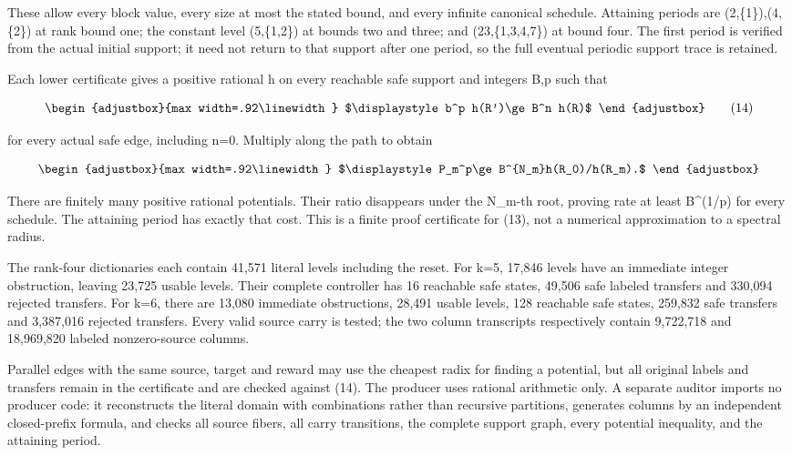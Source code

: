 These allow every block value, every size at most the stated bound, and every infinite canonical schedule. Attaining periods are (2,\{1\}),(4,\{2\}) at rank bound one; the constant level (5,\{1,2\}) at bounds two and three; and (23,\{1,3,4,7\}) at bound four. The first period is verified from the actual initial support; it need not return to that support after one period, so the full eventual periodic support trace is retained.

Each lower certificate gives a positive rational h on every reachable safe support and integers B,p such that

\[
\begin{adjustbox}{max width=.92\linewidth}
$\displaystyle b^p h(R')\ge B^n h(R)$
\end{adjustbox}
\tag{14}
\]

for every actual safe edge, including n=0. Multiply along the path to obtain

\[
\begin{adjustbox}{max width=.92\linewidth}
$\displaystyle P_m^p\ge B^{N_m}h(R_0)/h(R_m).$
\end{adjustbox}
\]

There are finitely many positive rational potentials. Their ratio disappears under the N\_m-th root, proving rate at least B\^{}(1/p) for every schedule. The attaining period has exactly that cost. This is a finite proof certificate for (13), not a numerical approximation to a spectral radius.

The rank-four dictionaries each contain 41,571 literal levels including the reset. For k=5, 17,846 levels have an immediate integer obstruction, leaving 23,725 usable levels. Their complete controller has 16 reachable safe states, 49,506 safe labeled transfers and 330,094 rejected transfers. For k=6, there are 13,080 immediate obstructions, 28,491 usable levels, 128 reachable safe states, 259,832 safe transfers and 3,387,016 rejected transfers. Every valid source carry is tested; the two column transcripts respectively contain 9,722,718 and 18,969,820 labeled nonzero-source columns.

Parallel edges with the same source, target and reward may use the cheapest radix for finding a potential, but all original labels and transfers remain in the certificate and are checked against (14). The producer uses rational arithmetic only. A separate auditor imports no producer code: it reconstructs the literal domain with combinations rather than recursive partitions, generates columns by an independent closed-prefix formula, and checks all source fibers, all carry transitions, the complete support graph, every potential inequality, and the attaining period.

